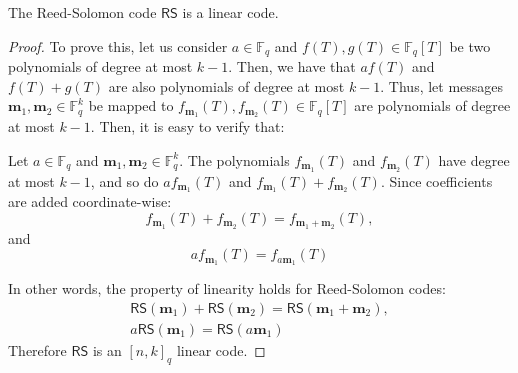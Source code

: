 \documentclass[../../book]{subfiles}
\begin{document}
\begin{proposition}\label{prop:rs-linear}
  The Reed-Solomon code $\mathsf{RS}$ is a linear code.
\end{proposition}

\begin{proof}
    To prove this, let us consider $a\in \mathbb{F}_q$ and $f(T), g(T)\in \mathbb{F}_q[T]$ be two polynomials of degree at most $k-1$. Then, we have that $af(T)$ and $f(T)+g(T)$ are also polynomials of degree at most $k-1$. Thus, let messages $\mathbf{m}_1, \mathbf{m}_2 \in \mathbb{F}_q^k$ be mapped to $f_{\mathbf{m}_1}(T), f_{\mathbf{m}_2}(T) \in \mathbb{F}_q[T]$ are polynomials of degree at most $k-1$. Then, it is easy to verify that:

    Let $a \in \mathbb{F}_q$ and $\mathbf{m}_1, \mathbf{m}_2 \in \mathbb{F}_q^k$. The polynomials $f_{\mathbf{m}_1}(T)$ and $f_{\mathbf{m}_2}(T)$ have degree at most $k-1$, and so do $a f_{\mathbf{m}_1}(T)$ and $f_{\mathbf{m}_1}(T) + f_{\mathbf{m}_2}(T)$. Since coefficients are added coordinate-wise:
    \begin{equation*}
      f_{\mathbf{m}_1}(T) + f_{\mathbf{m}_2}(T) = f_{\mathbf{m}_1+\mathbf{m}_2}(T),
    \end{equation*}
    and 
    \begin{equation*}
      a f_{\mathbf{m}_1}(T) = f_{a\mathbf{m}_1}(T)
    \end{equation*}

    In other words, the property of linearity holds for Reed-Solomon codes:
    \begin{gather*}
      \mathsf{RS}(\mathbf{m}_1) + \mathsf{RS}(\mathbf{m}_2) = \mathsf{RS}(\mathbf{m}_1+\mathbf{m}_2), \\ a \mathsf{RS}(\mathbf{m}_1) = \mathsf{RS}(a\mathbf{m}_1)
    \end{gather*}
    Therefore $\mathsf{RS}$ is an $[n,k]_q$ linear code.
\end{proof}
\end{document}
